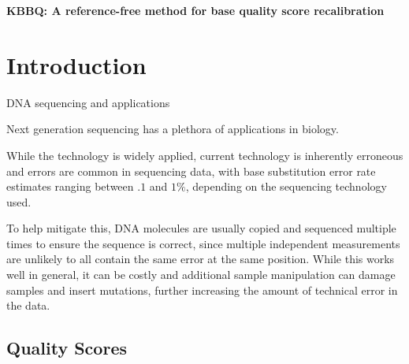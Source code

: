 \documentclass{article}
\begin{document}
\linenumbers

\textbf{KBBQ: A reference-free method for base quality score recalibration}

\section{Introduction}

\begin{outline}
	\item DNA sequencing and applications
	\begin{outline}
		\item Next generation sequencing has a plethora of applications in biology. %
		\item While the technology is widely applied, current technology is inherently erroneous and errors are common in sequencing data, with base substitution error rate estimates ranging between $.1$ and $1\%$, depending on the sequencing technology used. %
		\item To help mitigate this, DNA molecules are usually copied and sequenced multiple times to ensure the sequence is correct, since multiple independent measurements are unlikely to all contain the same error at the same position. While this works well in general, it can be costly and additional sample manipulation can damage samples and insert mutations, further increasing the amount of technical error in the data. %
	\end{outline}
\end{outline}

\subsection{Quality Scores}
\end{document}
